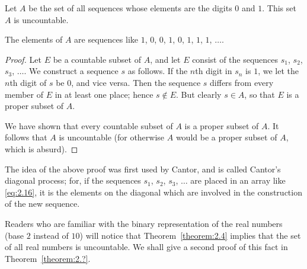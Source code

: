 \begin{theorem}\label{theorem:2.4}
    Let \(A\) be the set of all sequences whose elements are the digits \(0\) and \(1\). This set \(A\) is uncountable.
\end{theorem}

The elements of \(A\) are sequences like \(1\), \(0\), \(0\), \(1\), \(0\), \(1\), \(1\), \(1\), \(\ldots\).

\begin{proof}
    Let \(E\) be a countable subset of \(A\), and let \(E\) consist of the sequences \(s_1\), \(s_2\), \(s_3\), \(\ldots\). We construct a sequence \(s\) as follows. If the \(n\)th digit in \(s_n\) is \(1\), we let the \(n\)th digit of \(s\) be \(0\), and vice versa. Then the sequence \(s\) differs from every member of \(E\) in at least one place; hence \(s\notin E\). But clearly \(s\in A\), so that \(E\) is a proper subset of \(A\).

    We have shown that every countable subset of \(A\) is a proper subset of \(A\). It follows that \(A\) is uncountable (for otherwise \(A\) would be a proper subset of \(A\), which is absurd).
\end{proof}

The idea of the above proof was first used by Cantor, and is called Cantor's diagonal process; for, if the sequences \(s_1\), \(s_2\), \(s_3\), \(\ldots\) are placed in an array like \eqref{eq:2.16}, it is the elements on the diagonal which are involved in the construction of the new sequence.

Readers who are familiar with the binary representation of the real numbers (base \(2\) instead of \(10\)) will notice that Theorem~\ref{theorem:2.4} implies that the set of all real numbers is uncountable. We shall give a second proof of this fact in Theorem~\ref{theorem:2.?}.

